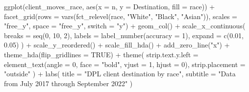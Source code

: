 \documentclass[
  letterpaper,
  DIV=11,
  numbers=noendperiod]{scrartcl}
\newenvironment{Shaded}{\begin{snugshade}}{\end{snugshade}}
\newcommand{\AttributeTok}[1]{\textcolor[rgb]{0.40,0.45,0.13}{#1}}
\newcommand{\ConstantTok}[1]{\textcolor[rgb]{0.56,0.35,0.01}{#1}}
\newcommand{\DecValTok}[1]{\textcolor[rgb]{0.68,0.00,0.00}{#1}}
\newcommand{\FloatTok}[1]{\textcolor[rgb]{0.68,0.00,0.00}{#1}}
\newcommand{\FunctionTok}[1]{\textcolor[rgb]{0.28,0.35,0.67}{#1}}
\newcommand{\NormalTok}[1]{\textcolor[rgb]{0.00,0.23,0.31}{#1}}
\newcommand{\SpecialCharTok}[1]{\textcolor[rgb]{0.37,0.37,0.37}{#1}}
\newcommand{\StringTok}[1]{\textcolor[rgb]{0.13,0.47,0.30}{#1}}
\begin{document}
\begin{Shaded}
\begin{Highlighting}[]
\FunctionTok{ggplot}\NormalTok{(client\_moves\_race, }\FunctionTok{aes}\NormalTok{(}\AttributeTok{x =}\NormalTok{ n, }\AttributeTok{y =}\NormalTok{ Destination, }\AttributeTok{fill =}\NormalTok{ race)) }\SpecialCharTok{+}
  \FunctionTok{facet\_grid}\NormalTok{(}\AttributeTok{rows =} \FunctionTok{vars}\NormalTok{(}\FunctionTok{fct\_relevel}\NormalTok{(race, }\StringTok{"White"}\NormalTok{, }\StringTok{"Black"}\NormalTok{, }\StringTok{"Asian"}\NormalTok{)), }\AttributeTok{scales =} \StringTok{"free\_y"}\NormalTok{, }\AttributeTok{space =} \StringTok{"free\_y"}\NormalTok{, }\AttributeTok{switch =} \StringTok{"y"}\NormalTok{) }\SpecialCharTok{+}
  \FunctionTok{geom\_col}\NormalTok{() }\SpecialCharTok{+}
  \FunctionTok{scale\_x\_continuous}\NormalTok{(}
    \AttributeTok{breaks =} \FunctionTok{seq}\NormalTok{(}\DecValTok{0}\NormalTok{, }\DecValTok{10}\NormalTok{, }\DecValTok{2}\NormalTok{),}
    \AttributeTok{labels =} \FunctionTok{label\_number}\NormalTok{(}\AttributeTok{accuracy =} \DecValTok{1}\NormalTok{),}
    \AttributeTok{expand =} \FunctionTok{c}\NormalTok{(}\FloatTok{0.01}\NormalTok{, }\FloatTok{0.05}\NormalTok{)}
\NormalTok{    ) }\SpecialCharTok{+}
  \FunctionTok{scale\_y\_reordered}\NormalTok{() }\SpecialCharTok{+}
  \FunctionTok{scale\_fill\_hda}\NormalTok{() }\SpecialCharTok{+}
  \FunctionTok{add\_zero\_line}\NormalTok{(}\StringTok{"x"}\NormalTok{) }\SpecialCharTok{+}
  \FunctionTok{theme\_hda}\NormalTok{(}\AttributeTok{flip\_gridlines =} \ConstantTok{TRUE}\NormalTok{) }\SpecialCharTok{+}
  \FunctionTok{theme}\NormalTok{(}
    \AttributeTok{strip.text.y.left =} \FunctionTok{element\_text}\NormalTok{(}\AttributeTok{angle =} \DecValTok{0}\NormalTok{, }\AttributeTok{face =} \StringTok{"bold"}\NormalTok{, }\AttributeTok{vjust =} \DecValTok{1}\NormalTok{, }\AttributeTok{hjust =} \DecValTok{0}\NormalTok{),}
    \AttributeTok{strip.placement =} \StringTok{"outside"}
\NormalTok{  ) }\SpecialCharTok{+}
  \FunctionTok{labs}\NormalTok{(}
    \AttributeTok{title =} \StringTok{"DPL client destination by race"}\NormalTok{,}
    \AttributeTok{subtitle =} \StringTok{"Data from July 2017 through September 2022"}
\NormalTok{  )}
\end{Highlighting}
\end{Shaded}
\end{document}

